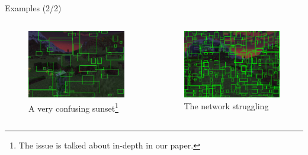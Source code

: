 \documentclass[english]{beamer}
\begin{document}
\begin{frame}{Examples (2/2)}
	\begin{columns}
	    
	    \begin{column}{0.5\textwidth}
    		\begin{figure}
	    \centering
	    \includegraphics[width=1.0\textwidth]{../images/sunset2.jpeg}
	   \caption{A very confusing sunset\footnote{The issue is talked about in-depth in our paper.}}
		\end{figure}
	    \end{column}
	
	    \begin{column}{0.5\textwidth}
	      \begin{figure}
	        \centering
	            \includegraphics[width=1.0\textwidth]{../images/sunset.png}
	            \caption{The network struggling}
	        \end{figure}
	    \end{column}
	  \end{columns}
\end{frame}
\end{document}
